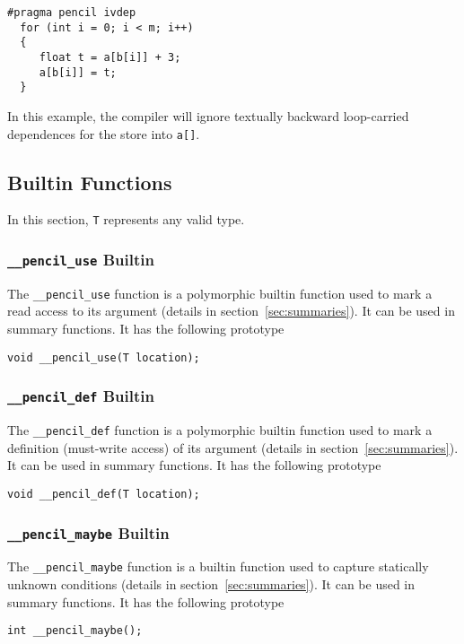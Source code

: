   \begin{lstlisting}[language=pencil]
  #pragma pencil ivdep
  for (int i = 0; i < m; i++)
  {
     float t = a[b[i]] + 3;
     a[b[i]] = t;
  }
  \end{lstlisting}
  In this example, the compiler will ignore textually backward
  loop-carried dependences for the store into \lstinline!a[]!.


\subsection{\label{sec:builtins}Builtin Functions}

In this section, \lstinline!T! represents any valid \pencil type.

\subsubsection{\texttt{\_\_pencil\_use} Builtin}

  The \lstinline!__pencil_use! function is
  a polymorphic builtin function used to mark a read access to
  its argument
  (details in section~\ref{sec:summaries}).
  It can be used in summary functions.
  It has the following prototype
  
  \lstinline!void __pencil_use(T location);!



\subsubsection{\texttt{\_\_pencil\_def} Builtin}

  The \lstinline!__pencil_def! function is a polymorphic
  builtin function used to mark a definition (must-write
  access) of its argument (details in
  section~\ref{sec:summaries}).
  It can be used in summary functions.
  It has the following prototype
  
  \lstinline!void __pencil_def(T location);!


\subsubsection{\texttt{\_\_pencil\_maybe} Builtin}

  The \lstinline!__pencil_maybe! function is
  a builtin function used to capture statically unknown conditions
  (details in section~\ref{sec:summaries}).
  It can be used in summary functions.
  It has the following prototype
  
  \lstinline!int __pencil_maybe();!

